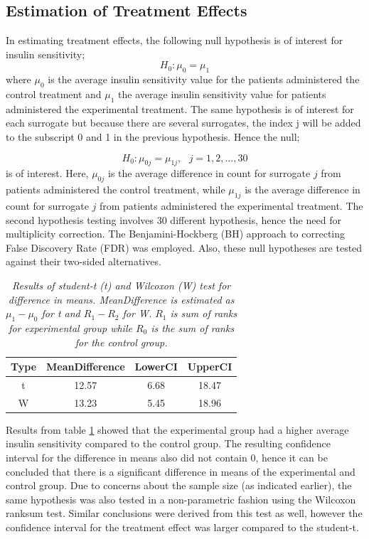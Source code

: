 \documentclass[a4paper,12pt]{article}
\begin{document}
	\subsection{Estimation of Treatment Effects}
	In estimating treatment effects, the following null hypothesis is of interest for insulin sensitivity;
	$$ H_0: \mu_{0} = \mu_{1}$$
	where $\mu_{0}$ is the average insulin sensitivity value for the patients administered the control treatment and $\mu_{1}$ the average insulin sensitivity value for patients administered the experimental treatment. The same hypothesis is of interest for each surrogate but because there are several surrogates, the index j will be added to the subscript 0 and 1 in the previous hypothesis. Hence the null;
	
	$$ H_0: \mu_{0j} = \mu_{1j}, \ \ \ j=1, 2, \ldots, 30$$
	is of interest. Here, $\mu_{0j}$ is the average difference in count for surrogate $j$ from patients administered the control treatment, while $\mu_{1j}$ is the average difference in count for surrogate $j$ from patients administered the experimental treatment. The second hypothesis testing involves 30 different hypothesis, hence the need for multiplicity correction. The Benjamini-Hockberg (BH) approach\citep{DNAmicroarray} to correcting False Discovery Rate (FDR) was employed. Also, these null hypotheses are tested against their two-sided alternatives.
	
	\begin{table}[H]
		\centering
		\begin{tabular}{cccc}
			\hline
			Type & MeanDifference & LowerCI & UpperCI\\
			\hline
			t & 12.57 & 6.68 & 18.47\\
			W & 13.23 & 5.45 & 18.96\\
			\hline
		\end{tabular}
		\caption{\emph{Results of student-t (t) and Wilcoxon (W) test for difference in means. MeanDifference is estimated as $\mu_{1} - \mu_{0}$ for t and $R_{1} - R_{2}$ for W. $R_1$ is sum of ranks for experimental group while $R_0$ is the sum of ranks for the control group.}}\label{Tresults}
	\end{table}
	Results from table \ref{Tresults} showed that the experimental group had a higher average insulin sensitivity compared to the control group. The resulting confidence interval for the difference in means also did not contain 0, hence it can be concluded that there is a significant difference in means of the experimental and control group. Due to concerns about the sample size (as indicated earlier), the same hypothesis was also tested in a non-parametric fashion using the Wilcoxon ranksum test. Similar conclusions were derived from this test as well, however the confidence interval for the treatment effect was larger compared to the student-t.\\
	
\end{document}
